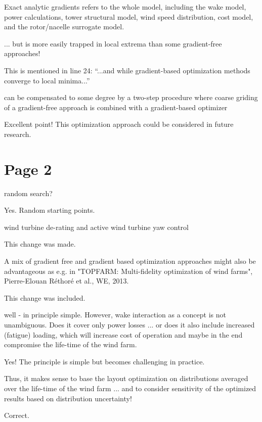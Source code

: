 \documentclass[12pt]{report}
\begin{document}
\color{blue} Exact analytic gradients refers to the whole model, including the wake model, power calculations, tower structural model, wind speed distribution, cost model, and the rotor/nacelle surrogate model.

\bigskip \color{black}
... but is more easily trapped in local extrema than some gradient-free approaches!

\color{blue} This is mentioned in line 24: ``...and while gradient-based optimization methods converge to local minima...''

\bigskip \color{black}
can be compensated to some degree by a two-step procedure where coarse griding of a gradient-free approach is combined with a gradient-based optimizer 

\color{blue} Excellent point! This optimization approach could be considered in future research.

\bigskip \color{black}
\section*{Page 2}
\bigskip \color{black}
random search?

\color{blue} Yes. Random starting points.

\bigskip \color{black}
wind turbine de-rating and active wind turbine yaw control

\color{blue} This change was made.

\bigskip \color{black}
A mix of gradient free and gradient based optimization approaches might also be advantageous as e.g. in "TOPFARM: Multi-fidelity optimization of wind farms",
Pierre-Elouan Réthoré et al., WE, 2013.

\color{blue} This change was included.

\bigskip \color{black}
well - in principle simple. However, wake interaction as a concept is not unambiguous. Does it cover only power losses ... or does it also include increased (fatigue) loading, which will increase cost of operation and maybe in the end compromise the life-time of the wind farm.

\color{blue} Yes! The principle is simple but becomes challenging in practice.

\bigskip \color{black}
Thus, it makes sense to base the layout optimization on distributions averaged over the life-time of the wind farm ... and to consider sensitivity of the optimized results based on distribution uncertainty!

\color{blue} Correct.
\end{document}
